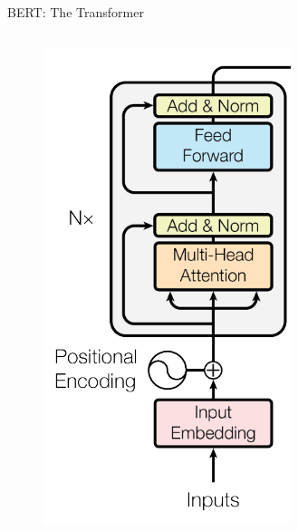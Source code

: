 \documentclass[12pt]{beamer}
\begin{document}
\begin{frame}{BERT: The Transformer}
\begin{columns}
\begin{column}{0.3\linewidth}
\begin{figure}
			\includegraphics[width=\linewidth]{img/transformer.png}
			\end{figure}
		\end{column}
	\end{columns}
	
\end{frame}
\end{document}
